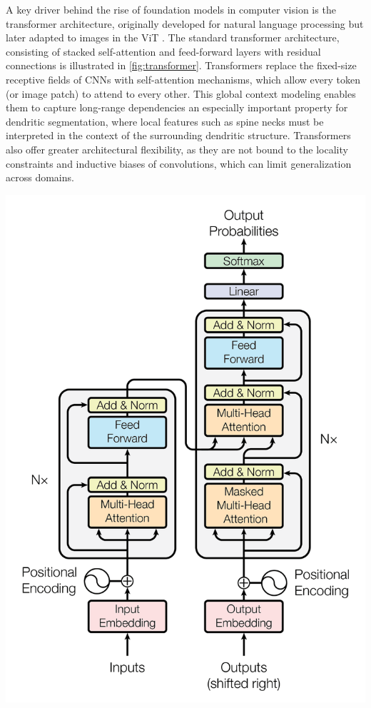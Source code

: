 A key driver behind the rise of foundation models in computer vision is the transformer architecture, originally developed for natural language processing but later adapted to images in the \gls{ViT} \cite{Vaswani_2017, Dosovitskiy_2020}. The standard transformer architecture, consisting of stacked self-attention and feed-forward layers with residual connections is illustrated in \autoref{fig:transformer}. Transformers replace the fixed-size receptive fields of \gls{CNN}s with self-attention mechanisms, which allow every token (or image patch) to attend to every other. This global context modeling enables them to capture long-range dependencies an especially important property for dendritic segmentation, where local features such as spine necks must be interpreted in the context of the surrounding dendritic structure. Transformers also offer greater architectural flexibility, as they are not bound to the locality constraints and inductive biases of convolutions, which can limit generalization across domains.

\begin{center}
    \includegraphics[width=.7\textwidth]{figures/11_transformer.png} 
    \label{fig:transformer}
\end{center}

